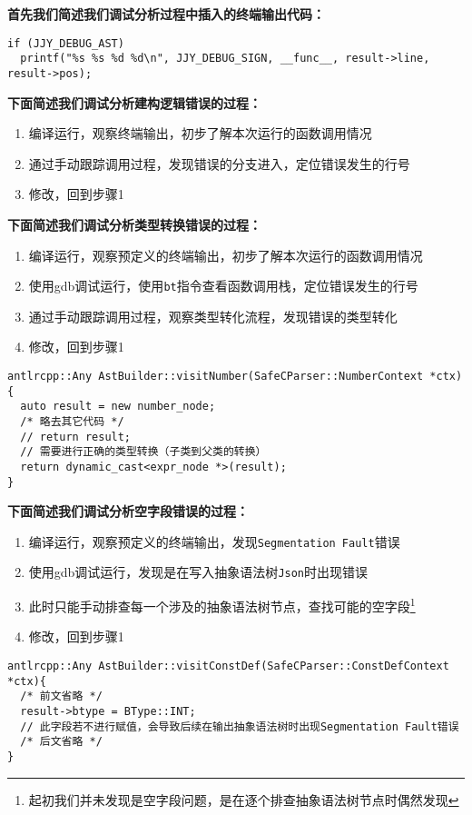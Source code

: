 \documentclass[../main.tex]{subfiles}
\begin{document}
\textbf{首先我们简述我们调试分析过程中插入的终端输出代码：}

\begin{mdframed}
	\begin{verbatim}
if (JJY_DEBUG_AST)
  printf("%s %s %d %d\n", JJY_DEBUG_SIGN, __func__, result->line, result->pos);
  \end{verbatim}
\end{mdframed}


\textbf{下面简述我们调试分析建构逻辑错误的过程：}

\begin{enumerate}
	\item 编译运行，观察终端输出，初步了解本次运行的函数调用情况
	\item 通过手动跟踪调用过程，发现错误的分支进入，定位错误发生的行号
	\item 修改，回到步骤1
\end{enumerate}


\textbf{下面简述我们调试分析类型转换错误的过程：}

\begin{enumerate}
	\item 编译运行，观察预定义的终端输出，初步了解本次运行的函数调用情况
	\item 使用gdb调试运行，使用\texttt{bt}指令查看函数调用栈，定位错误发生的行号
	\item 通过手动跟踪调用过程，观察类型转化流程，发现错误的类型转化
	\item 修改，回到步骤1
\end{enumerate}

\begin{mdframed}
	\begin{verbatim}
antlrcpp::Any AstBuilder::visitNumber(SafeCParser::NumberContext *ctx) {
  auto result = new number_node;
  /* 略去其它代码 */
  // return result;
  // 需要进行正确的类型转换（子类到父类的转换）
  return dynamic_cast<expr_node *>(result);
}
  \end{verbatim}
\end{mdframed}


\textbf{下面简述我们调试分析空字段错误的过程：}

\begin{enumerate}
	\item 编译运行，观察预定义的终端输出，发现\texttt{Segmentation Fault}错误
	\item 使用gdb调试运行，发现是在写入抽象语法树\texttt{Json}时出现错误
	\item 此时只能手动排查每一个涉及的抽象语法树节点，查找可能的空字段\footnote{起初我们并未发现是空字段问题，是在逐个排查抽象语法树节点时偶然发现}
	\item 修改，回到步骤1
\end{enumerate}

\begin{mdframed}
	\begin{verbatim}
antlrcpp::Any AstBuilder::visitConstDef(SafeCParser::ConstDefContext *ctx){
  /* 前文省略 */
  result->btype = BType::INT;
  // 此字段若不进行赋值，会导致后续在输出抽象语法树时出现Segmentation Fault错误
  /* 后文省略 */
}
  \end{verbatim}
\end{mdframed}
\end{document}
